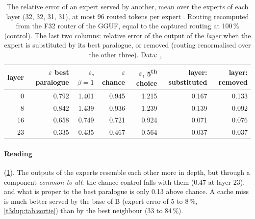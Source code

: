\begin{table}[tbp]
\centering\small
\begin{tabular}{r r r r r r r}
\toprule
layer & $\varepsilon$ best paralogue & $\varepsilon$, $\beta = 1$ & $\varepsilon$ chance & $\varepsilon$, 5\textsuperscript{th} choice & layer: substituted & layer: removed \\
\midrule
0 & 0.792 & 1.401 & 0.945 & 1.215 & 0.167 & 0.133 \\
8 & 0.842 & 1.439 & 0.936 & 1.239 & 0.139 & 0.092 \\
16 & 0.658 & 0.749 & 0.721 & 0.924 & 0.071 & 0.076 \\
23 & 0.335 & 0.435 & 0.467 & 0.564 & 0.037 & 0.037 \\
\bottomrule
\end{tabular}
\caption[Paralogues, by depth]{The relative error of an expert served by another, mean over the experts of each layer (32, 32, 31, 31), at most 96 routed tokens per expert \mes. Routing recomputed from the F32 router of the GGUF, equal to the captured routing at 100\,\% (control). The last two columns: relative error of the output of the \emph{layer} when the expert is substituted by its best paralogue, or removed (routing renormalised over the other three). Data: , .}
\label{t3dup:tab:paralogues}
\end{table}

\paragraph{Reading} (\cref{t3dup:tab:paralogues}). The outputs of the experts resemble each other more in depth, but through a component \emph{common to all}: the chance control falls with them (0.47 at layer 23), and what is proper to the best paralogue is only 0.13 above chance. A cache miss is much better served by the base of B (expert error of 5 to 8\,\%, \cref{t3dup:tab:sortie}) than by the best neighbour (33 to 84\,\%).

